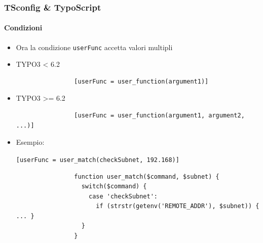 \begin{frame}[fragile]
	\frametitle{TSconfig \& TypoScript}
	\framesubtitle{Condizioni}

	\begin{itemize}
		\item Ora la condizione \texttt{userFunc} accetta valori multipli

		\item TYPO3 < 6.2
			\begin{lstlisting}
				[userFunc = user_function(argument1)]
			\end{lstlisting}

		\item TYPO3 >= 6.2
			\begin{lstlisting}
				[userFunc = user_function(argument1, argument2, ...)]
			\end{lstlisting}

		\item Esempio:

			\lstinline![userFunc = user_match(checkSubnet, 192.168)]!

			\begin{lstlisting}
				function user_match($command, $subnet) {
				  switch($command) {
				    case 'checkSubnet':
				      if (strstr(getenv('REMOTE_ADDR'), $subnet)) { ... }
				  }
				}
			\end{lstlisting}

	\end{itemize}

\end{frame}


